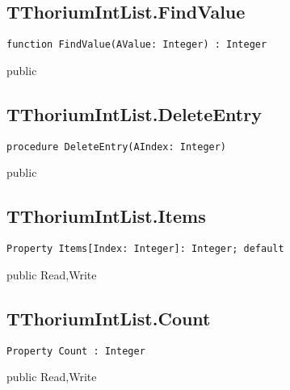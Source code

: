 \subsection{TThoriumIntList.FindValue}
\label{thoriumcore:thorium:tthoriumintlist:findvalue}
\begin{FPCList}
\Synopsis
\Declaration 

\begin{verbatim}
function FindValue(AValue: Integer) : Integer
\end{verbatim}
\Visibility
public
\Description
\Errors
\end{FPCList}
\subsection{TThoriumIntList.DeleteEntry}
\label{thoriumcore:thorium:tthoriumintlist:deleteentry}
\begin{FPCList}
\Synopsis
\Declaration 

\begin{verbatim}
procedure DeleteEntry(AIndex: Integer)
\end{verbatim}
\Visibility
public
\Description
\Errors
\end{FPCList}
\subsection{TThoriumIntList.Items}
\label{thoriumcore:thorium:tthoriumintlist:items}
\begin{FPCList}
\Synopsis
\Declaration 

\begin{verbatim}
Property Items[Index: Integer]: Integer; default
\end{verbatim}
\Visibility
public
\Access
Read,Write
\Description
\end{FPCList}
\subsection{TThoriumIntList.Count}
\label{thoriumcore:thorium:tthoriumintlist:count}
\begin{FPCList}
\Synopsis
\Declaration 

\begin{verbatim}
Property Count : Integer
\end{verbatim}
\Visibility
public
\Access
Read,Write
\Description
\end{FPCList}
